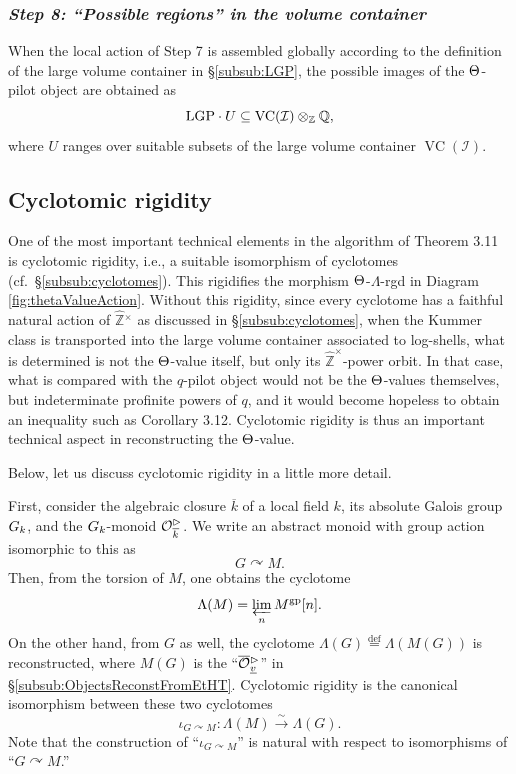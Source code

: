\documentclass[12pt, reqno, a4paper]{amsart}
\def\udl#1{\underline{#1}} %
\def\ovl#1{\overline{#1}} %
\def\what#1{\widehat{#1}} %
\def\eqdef{\stackrel{\textrm{def}}{=}} %
\def\simlongto{\stackrel{\sim}{\longrightarrow}} %
\def\acton{\curvearrowright} %
\def\bZ{\mathbb{Z}} %
\def\bQ{\mathbb{Q}} %
\def\cI{{\mathcal{I}}}
\def\hbZ{\what{\bZ}} %
\def\uv{\udl{v}} %
\def\gp{\mathrm{gp}}
\DeclareMathOperator{\VC}{VC}
\begin{document}
\subsubsection{\emph{Step 8: ``Possible regions'' in the volume container}}
When the local action of Step 7 is assembled globally according to the definition of the large volume container in \S\ref{subsub:LGP}, the possible images of the \(\Th\)-pilot object are obtained as
\[
  \LGP\cdot U\subseteq \VC(\cI)\otimes_{\bZ}\bQ, 
\]
where $U$ ranges over suitable subsets of the large volume container $\VC(\cI)$.



\subsection{Cyclotomic rigidity}\label{sub:cyclotomicRigidity}
One of the most important technical elements in the algorithm of Theorem 3.11 is cyclotomic rigidity, i.e., a suitable isomorphism of cyclotomes (cf.\ \S\ref{subsub:cyclotomes}).  
This rigidifies the morphism $\Th$-$\Lambda$-rgd in Diagram \ref{fig:thetaValueAction}.
Without this rigidity, since every cyclotome has a faithful natural action of $\widehat{\mathbb{Z}}{}^\times$
as discussed in \S\ref{subsub:cyclotomes}, when the Kummer class is transported into the large volume container associated to log-shells, what is determined is not the \(\Th\)-value itself, but only its \(\hbZ^{\times}\)-power orbit.
In that case, what is compared with the \(q\)-pilot object would not be the $\Th$-values themselves, but indeterminate profinite powers of \(q\), and it would become hopeless to obtain an inequality such as Corollary 3.12.
Cyclotomic rigidity is thus an important technical aspect in reconstructing the \(\Th\)-value.

Below, let us discuss cyclotomic rigidity in a little more detail.

First, consider the algebraic closure \(\ovl{k}\) of a local field \(k\), its absolute Galois group \(\GG_k\), and the \(\GG_k\)-monoid \(\OOt_{\ovl{k}}\).
We write an abstract monoid with group action isomorphic to this as
\[
  G\acton M.
\]
Then, from the torsion of \(M\), one obtains the cyclotome
\[
  \Lambda(M)=\varprojlim_n M^{\gp}[n].
\]
On the other hand, from \(G\) as well, the cyclotome \(\Lambda(G)\eqdef\Lambda(M(G))\) is reconstructed, where $M(G)$ is the ``$\oOOt_{\uv}$'' in \S \ref{subsub:ObjectsReconstFromEtHT}.
Cyclotomic rigidity is the canonical isomorphism between these two cyclotomes
\begin{equation}\label{eqn:basicCyclotomicRigidity}
  \iota_{G\acton M}\colon
  \Lambda(M)
  \simlongto
  \Lambda(G).  
\end{equation}
Note that the construction of ``$\iota_{G\acton M}$'' is natural with respect to isomorphisms of ``$G\acton M$.''
\end{document}
